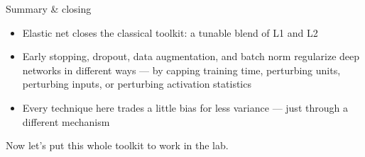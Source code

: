 \documentclass[aspectratio=169, 10pt]{beamer}
\begin{document}
\begin{frame}{Summary \& closing}
  \begin{itemize}
    \item Elastic net closes the classical toolkit: a tunable blend of L1 and L2
    \item Early stopping, dropout, data augmentation, and batch norm regularize deep networks in different ways --- by capping training time, perturbing units, perturbing inputs, or perturbing activation statistics
    \item Every technique here trades a little bias for less variance --- just through a different mechanism
  \end{itemize}
  \vspace{0.5em}
  Now let's put this whole toolkit to work in the lab.
\end{frame}
\end{document}
